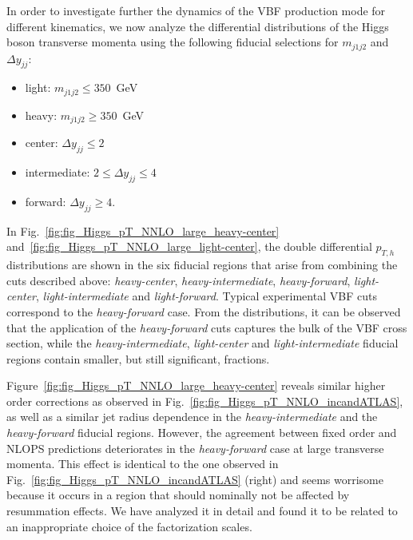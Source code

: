 \documentclass[10pt,prd,fleqn,superscriptaddress,notitlepage,nofootinbib,preprintnumbers,nobalancelastpage]{revtex4-1}
\newcommand{\VBF}{VBF\xspace}
\begin{document}
In order to investigate further the dynamics of the \VBF production mode for different kinematics, we now analyze the differential distributions of the Higgs boson transverse momenta using the following fiducial selections for $m_{j1j2}$ and $\Delta y_{jj}$:
\begin{itemize}
    \item light: $m_{j1j2} \le 350$~GeV
    \item heavy: $m_{j1j2} \ge 350$~GeV
    \item center: $\Delta y_{jj} \le 2$
    \item intermediate: $2 \le \Delta y_{jj} \le 4$
    \item forward: $\Delta y_{jj} \ge 4$.
\end{itemize}
In Fig.~\ref{fig:fig_Higgs_pT_NNLO_large_heavy-center} and~\ref{fig:fig_Higgs_pT_NNLO_large_light-center}, the double differential $p_{T,h}$ distributions are shown in the six fiducial regions that arise from combining the  cuts described above: \textit{heavy-center}, \textit{heavy-intermediate}, \textit{heavy-forward}, \textit{light-center}, \textit{light-intermediate} and \textit{light-forward}. Typical experimental \VBF cuts correspond to the \textit{heavy-forward} case. From the distributions, it can be observed that the application of the  \textit{heavy-forward} cuts captures the bulk of the \VBF cross section, while the \textit{heavy-intermediate}, \textit{light-center} and \textit{light-intermediate} fiducial regions contain smaller, but still significant, fractions.

Figure~\ref{fig:fig_Higgs_pT_NNLO_large_heavy-center} reveals similar higher order corrections as observed in  Fig.~\ref{fig:fig_Higgs_pT_NNLO_incandATLAS}, as well as a similar jet radius dependence in the \textit{heavy-intermediate} and the \textit{heavy-forward} fiducial regions. However, the agreement between fixed order and NLOPS predictions deteriorates in the \textit{heavy-forward} case at large transverse momenta. This effect is identical to the one observed in Fig.~\ref{fig:fig_Higgs_pT_NNLO_incandATLAS} (right) and seems worrisome because it occurs in a region that should nominally not be affected by resummation effects. We have analyzed it in detail and found it to be related to an inappropriate choice of the factorization scales.
\end{document}
